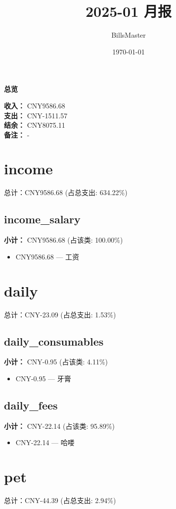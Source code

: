 \documentclass[12pt]{article}
\title{2025-01 月报}
\author{BillsMaster}
\date{\today}
\begin{document}
\maketitle

\vspace{1em}
\hrulefill
\begin{center}
    {\Large\bfseries 总览}\par\vspace{1em}
    {\large
    \textbf{收入：} CNY9586.68\\
    \textbf{支出：} CNY-1511.57\\
    \textbf{结余：} CNY8075.11\\
    \textbf{备注：} -
    }
\end{center}
\hrulefill

\section*{income}
总计：CNY9586.68 	 (占总支出: 634.22\%)

\subsection*{income\_salary}
\textbf{小计：} CNY9586.68 (占该类: 100.00\%)
\begin{itemize}
    \item CNY9586.68 --- 工资
\end{itemize}
\section*{daily}
总计：CNY-23.09 	 (占总支出: 1.53\%)

\subsection*{daily\_consumables}
\textbf{小计：} CNY-0.95 (占该类: 4.11\%)
\begin{itemize}
    \item CNY-0.95 --- 牙膏
\end{itemize}
\subsection*{daily\_fees}
\textbf{小计：} CNY-22.14 (占该类: 95.89\%)
\begin{itemize}
    \item CNY-22.14 --- 哈喽
\end{itemize}
\section*{pet}
总计：CNY-44.39 	 (占总支出: 2.94\%)
\end{document}
